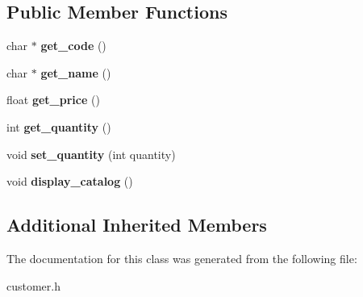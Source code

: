 \subsection*{Public Member Functions}
\begin{DoxyCompactItemize}
\item 
\mbox{\label{classcustomer_a1f6e71e10262a93b5bc35bdbad5a6012}} 
char $\ast$ {\bfseries get\+\_\+code} ()
\item 
\mbox{\label{classcustomer_a107b90ba36a4aa9cea24b708cf0718da}} 
char $\ast$ {\bfseries get\+\_\+name} ()
\item 
\mbox{\label{classcustomer_a5635d635de7211e7a645638b04e9a856}} 
float {\bfseries get\+\_\+price} ()
\item 
\mbox{\label{classcustomer_a5fd327e9850da893d4d6ddd3382792d3}} 
int {\bfseries get\+\_\+quantity} ()
\item 
\mbox{\label{classcustomer_a9d9033aea7fa63d5ee43edb6a112cc10}} 
void {\bfseries set\+\_\+quantity} (int quantity)
\item 
\mbox{\label{classcustomer_a5e4916ba70a62e0630471f8a808abe52}} 
void {\bfseries display\+\_\+catalog} ()
\end{DoxyCompactItemize}
\subsection*{Additional Inherited Members}


The documentation for this class was generated from the following file\+:\begin{DoxyCompactItemize}
\item 
customer.\+h\end{DoxyCompactItemize}
